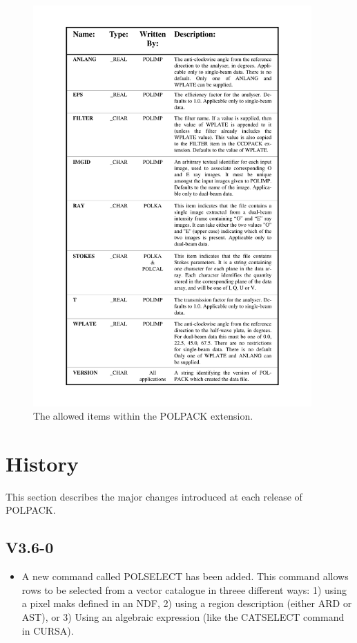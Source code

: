\documentclass[twoside,11pt]{starlink}
\begin{document}
  \begin{figure}[htbp]
  \begin{center}
  \includegraphics[clip,width=0.95\textwidth]{sun223_figures/polext}
  \caption{The allowed items within the POLPACK extension.}
  \label{fig:polext}
  \end{center}
  \end{figure}

\section{\label{APP:HISTORY}History}
This section describes the major changes introduced at each release of
POLPACK.

\subsection{V3.6-0}

\begin{itemize}
 \item A new command called POLSELECT has been added. This command allows
  rows to be selected from a vector catalogue in threee different ways:
  1) using a pixel maks defined in an NDF, 2) using a region description
  (either ARD or AST), or 3) Using an algebraic expression (like the
  CATSELECT command in CURSA).
\end{itemize}
\end{document}
